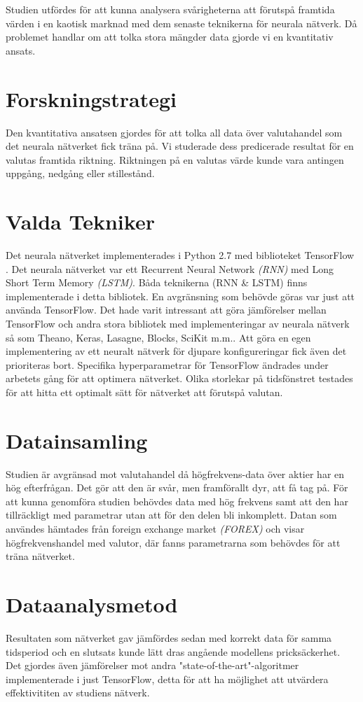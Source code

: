 Studien utfördes för att kunna analysera svårigheterna att förutspå framtida värden i en kaotisk marknad med dem senaste teknikerna för neurala nätverk. Då problemet handlar om att tolka stora mängder data gjorde vi en kvantitativ ansats.

\section{Forskningstrategi} 
Den kvantitativa ansatsen gjordes för att tolka all data över valutahandel som det neurala nätverket fick träna på. Vi studerade dess predicerade resultat för en valutas framtida riktning. Riktningen på en valutas värde kunde vara antingen uppgång, nedgång eller stillestånd. 

\section{Valda Tekniker} 
Det neurala nätverket implementerades i Python 2.7 med biblioteket TensorFlow \citep{tensorflow2015-whitepaper}. Det neurala nätverket var ett Recurrent Neural Network \textit{(RNN)} med Long Short Term Memory \textit{(LSTM)}. Båda teknikerna (RNN \& LSTM) finns implementerade i detta bibliotek. En avgränsning som behövde göras var just att använda TensorFlow. Det hade varit intressant att göra jämförelser mellan TensorFlow och andra stora bibliotek med implementeringar av neurala nätverk så som Theano, Keras, Lasagne, Blocks, SciKit m.m.. Att göra en egen implementering av ett neuralt nätverk för djupare konfigureringar fick även det prioriteras bort. Specifika hyperparametrar för TensorFlow ändrades under arbetets gång för att optimera nätverket. Olika storlekar på tidsfönstret testades för att hitta ett optimalt sätt för nätverket att förutspå valutan. 


\section{Datainsamling}
Studien är avgränsad mot valutahandel då högfrekvens-data över aktier har en hög efterfrågan. Det gör att den är svår, men framförallt dyr, att få tag på. För att kunna genomföra studien behövdes data med hög frekvens samt att den har tillräckligt med parametrar utan att för den delen bli inkomplett. Datan som användes hämtades från foreign exchange market \textit{(FOREX)} och visar högfrekvenshandel med valutor, där fanns parametrarna som behövdes för att träna nätverket.

\section{Dataanalysmetod}
Resultaten som nätverket gav jämfördes sedan med korrekt data för samma tidsperiod och en slutsats kunde lätt dras angående modellens pricksäckerhet. Det gjordes även jämförelser mot andra "state-of-the-art"-algoritmer implementerade i just TensorFlow, detta för att ha möjlighet att utvärdera effektivititen av studiens nätverk.
